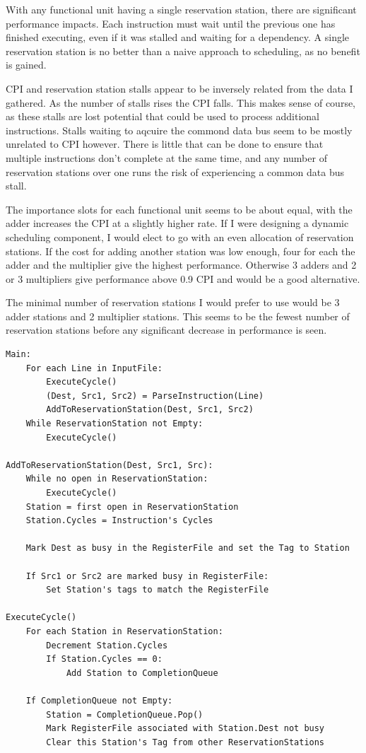 \documentclass[twocolumn,letterpaper,10pt]{article}
\begin{document}
With any functional unit having a single reservation station, there are significant performance impacts. Each instruction must wait until the previous one has finished executing, even if it was stalled and waiting for a dependency. A single reservation station is no better than a naive approach to scheduling, as no benefit is gained.

CPI and reservation station stalls appear to be inversely related from the data I gathered. As the number of stalls rises the CPI falls. This makes sense of course, as these stalls are lost potential that could be used to process additional instructions. Stalls waiting to aqcuire the commond data bus seem to be mostly unrelated to CPI however. There is little that can be done to ensure that multiple instructions don't complete at the same time, and any number of reservation stations over one runs the risk of experiencing a common data bus stall.

The importance slots for each functional unit seems to be about equal, with the adder increases the CPI at a slightly higher rate. If I were designing a dynamic scheduling component, I would elect to go with an even allocation of reservation stations. If the cost for adding another station was low enough, four for each the adder and the multiplier give the highest performance. Otherwise 3 adders and 2 or 3 multipliers give performance above 0.9 CPI and would be a good alternative. 

The minimal number of reservation stations I would prefer to use would be 3 adder stations and 2 multiplier stations. This seems to be the fewest number of reservation stations before any significant decrease in performance is seen.

\clearpage

\begin{lstlisting}[]
Main:
	For each Line in InputFile:
		ExecuteCycle()
		(Dest, Src1, Src2) = ParseInstruction(Line)
		AddToReservationStation(Dest, Src1, Src2)
	While ReservationStation not Empty:
		ExecuteCycle()

AddToReservationStation(Dest, Src1, Src):
	While no open in ReservationStation:
		ExecuteCycle()
	Station = first open in ReservationStation
	Station.Cycles = Instruction's Cycles

	Mark Dest as busy in the RegisterFile and set the Tag to Station

	If Src1 or Src2 are marked busy in RegisterFile:
		Set Station's tags to match the RegisterFile

ExecuteCycle()
	For each Station in ReservationStation:
		Decrement Station.Cycles
		If Station.Cycles == 0:
			Add Station to CompletionQueue
	
	If CompletionQueue not Empty:
		Station = CompletionQueue.Pop()
		Mark RegisterFile associated with Station.Dest not busy
		Clear this Station's Tag from other ReservationStations
		
\end{lstlisting}
\end{document}
